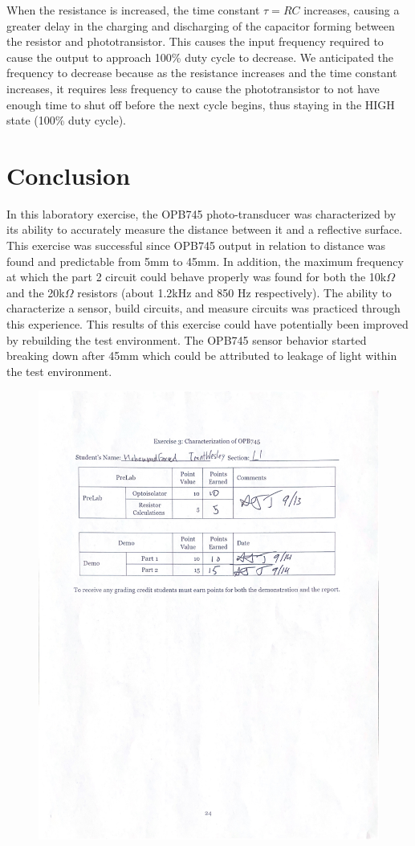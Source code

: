 \documentclass[CMPE]{KGCOEReport}
\begin{document}
When the resistance is increased, the time constant $\tau=RC$ increases, causing a greater delay in the charging and discharging of the capacitor forming between the resistor and phototransistor. This causes the input frequency required to cause the output to approach 100\% duty cycle to decrease. We anticipated the frequency to decrease because as the resistance increases and the time constant increases, it requires less frequency to cause the phototransistor to not have enough time to shut off before the next cycle begins, thus staying in the HIGH state (100\% duty cycle).

\section*{Conclusion}

In this laboratory exercise, the OPB745 photo-transducer was characterized by its ability to accurately measure the distance between it and a reflective surface. This exercise was successful since OPB745 output in relation to distance was found and predictable from 5mm to 45mm. In addition, the maximum frequency at which the part 2 circuit could behave properly was found for both the 10k$\Omega$ and the 20k$\Omega$ resistors (about 1.2kHz and 850 Hz respectively). The ability to characterize a sensor, build circuits, and measure circuits was practiced through this experience. This results of this exercise could have potentially been improved by rebuilding the test environment. The OPB745 sensor behavior started breaking down after 45mm which could be attributed to leakage of light within the test environment. 

\newpage
\begin{figure}[H]
    \centering
    \begin{adjustbox}{center}
        \includegraphics[width=1.35\textwidth]{signoff.pdf}
    \end{adjustbox}
\end{figure}
\end{document}
